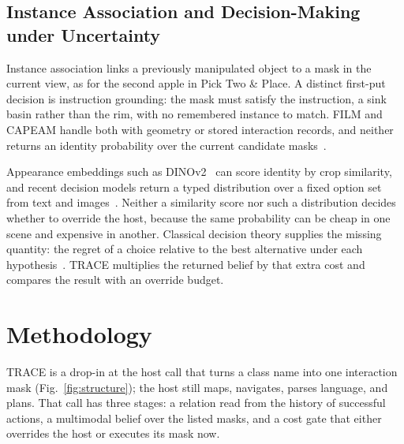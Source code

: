 \documentclass[conference]{IEEEtran}
\begin{document}
\subsection{Instance Association and Decision-Making under Uncertainty}
Instance association links a previously manipulated object to a mask in the current view, as for the second apple in Pick Two \& Place.
A distinct first-put decision is instruction grounding: the mask must satisfy the instruction, a sink basin rather than the rim, with no remembered instance to match.
FILM and CAPEAM handle both with geometry or stored interaction records, and neither returns an identity probability over the current candidate masks~\cite{min2022film,kim2023capeam}.

Appearance embeddings such as DINOv2~\cite{oquab2024dinov2} can score identity by crop similarity, and recent decision models return a typed distribution over a fixed option set from text and images~\cite{typesafe2026jev,openai2026decisions}.
Neither a similarity score nor such a distribution decides whether to override the host, because the same probability can be cheap in one scene and expensive in another.
Classical decision theory supplies the missing quantity: the regret of a choice relative to the best alternative under each hypothesis~\cite{savage1951regret}.
TRACE multiplies the returned belief by that extra cost and compares the result with an override budget.

\section{Methodology}
\label{sec:method}
TRACE is a drop-in at the host call that turns a class name into one interaction mask (Fig.~\ref{fig:structure}); the host still maps, navigates, parses language, and plans.
That call has three stages: a relation read from the history of successful actions, a multimodal belief over the listed masks, and a cost gate that either overrides the host or executes its mask now.
\end{document}
